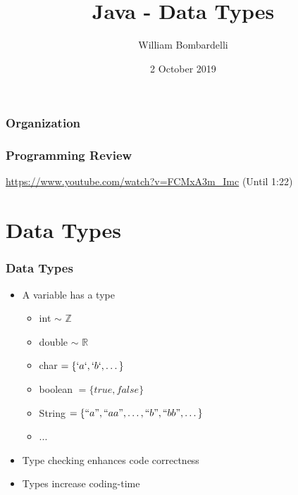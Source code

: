 \documentclass{beamer}
\title[Java]{Java - Data Types}
\author[W. Bombardelli]{William Bombardelli}
\institute[Schweizerschule Mexiko]
{
	\vskip 12pt
	Schweizerschule Mexiko, Ciudad de México, Mexico \\
	\texttt{\url{https://github.com/wbombardellis/java-unterricht}}
}
\date{2 October 2019}
\begin{document}
	\begin{frame}
		\titlepage
	\end{frame}
	
	\begin{frame}
		\frametitle{Organization}
		\tableofcontents
	\end{frame}

	\begin{frame}
		\frametitle{Programming Review}
		\url{https://www.youtube.com/watch?v=FCMxA3m_Imc} (Until 1:22)
	\end{frame}

	\section{Data Types}
	\begin{frame}
		\frametitle{Data Types}
		\begin{itemize}
			\item A variable has a type
			\begin{itemize}
				\item int $\sim$ $\mathbb{Z}$
				\item double $\sim$ $\mathbb{R}$
				\item char $= \{`a`, `b`, \dots \}$
				\item boolean $= \{true, false\}$
				\item String $= \{``a", ``aa", \dots, ``b", ``bb", \dots \}$
				\item ...
			\end{itemize}
			\pause
			\item {\color{green} Type checking enhances code correctness}
			\pause
			\item {\color{red} Types increase coding-time}
		\end{itemize}
	\end{frame}
\end{document}
